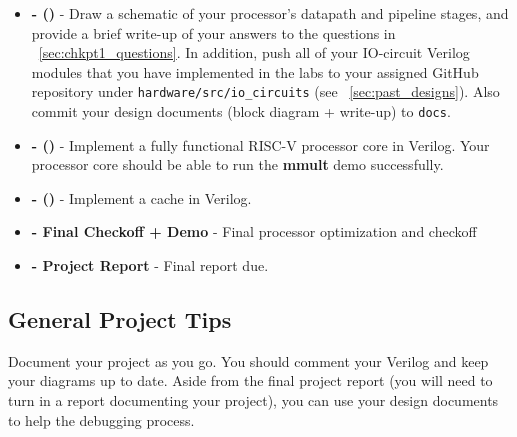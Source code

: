 \documentclass[11pt]{article}
\begin{document}
\begin{minipage}{\textwidth}
\vspace{2mm}
\begin{itemize}

  \item \textbf{\blockDiagramDueDate \space - \blockDiagramTaskName \space (\blockDiagramTimeAlloted)} - Draw a schematic of your processor's datapath and pipeline stages, and provide a brief write-up of your answers to the questions in ~\ref{sec:chkpt1_questions}. In addition, push all of your IO-circuit Verilog modules that you have implemented in the labs to your assigned GitHub repository under \verb|hardware/src/io_circuits| (see ~\ref{sec:past_designs}). Also commit your design documents (block diagram + write-up) to \verb|docs|.
  \item \textbf{\baseCPUDueDate \space - \baseCPUTaskName \space (\baseCPUTimeAlloted)} - Implement a fully functional RISC-V processor core in Verilog. Your processor core should be able to run the \textbf{mmult} demo successfully.

  \item \textbf{\cacheDueDate \space - \cacheTaskName \space (\cacheTimeAlloted)} - Implement a cache in Verilog.
  
  
  \item \textbf{\finalCheckoffDueDate \space - Final Checkoff + Demo} - Final processor optimization and checkoff
  \item \textbf{\finalReportDueDate \space - Project Report} - Final report due.
  
\end{itemize}
\vspace{2mm}
\end{minipage}


\subsection{General Project Tips}
\label{tips}
Document your project as you go.
You should comment your Verilog and keep your diagrams up to date.
Aside from the final project report (you will need to turn in a report documenting your project), you can use your design documents to help the debugging process.
\end{document}
